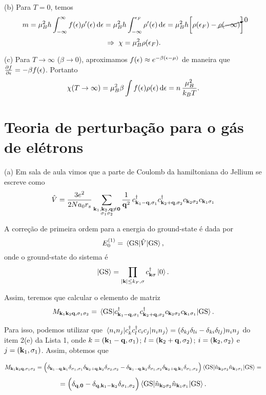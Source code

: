 \documentclass[a4paper,10pt]{article}
\begin{document}
(b) Para $T = 0$, temos
$$
m = \mu_B^2 h \int_{-\infty}^{\infty} f(\epsilon) \rho'(\epsilon) \dd{\epsilon} =
\mu_B^2 h \int_{-\infty}^{\epsilon_F} \rho'(\epsilon) \dd{\epsilon} =
\mu_B^2 h \qty[ \rho(\epsilon_F) - \cancelto{0}{\rho(-\infty)} ]
$$
$$
\; \Rightarrow \; \chi = \mu_B^2 \rho(\epsilon_F).
$$

(c) Para $T \to \infty$ ($\beta \to 0$), aproximamos $f(\epsilon) \approx e^{-\beta(\epsilon - \mu)}$ de maneira que $\pdv{f}{\epsilon} = -\beta f(\epsilon)$. Portanto
$$
\chi(T \to \infty) = \mu_B^2 \beta \int f(\epsilon) \rho(\epsilon) \dd{\epsilon} = n \, \frac{\mu_B^2}{k_B T}.
$$


\pagebreak


\section{Teoria de perturbação para o gás de elétrons}

(a) Em sala de aula vimos que a parte de Coulomb da hamiltoniana do Jellium se escreve como
\begin{equation} \label{eq:jellium}
\hat{V} = \frac{3 e^2}{2 N a_0 r_s}
\sum_{\substack{\vb{k}_1, \vb{k}_2, \vb{q} \neq \vb{0} \\ \sigma_1 \sigma_2}} \frac{1}{\vb{q}^2} \,
c_{\vb{k}_1 - \vb{q}, \sigma_1}^\dagger c_{\vb{k}_2 + \vb{q}, \sigma_2}^\dagger c_{\vb{k}_2 \sigma_2} c_{\vb{k}_1 \sigma_1}
\end{equation}

A correção de primeira ordem para a energia do ground-state é dada por
$$
E_0^{(1)} = \ev{\hat{V}}{\text{GS}},
$$
onde o ground-state do sistema é
$$
\ket{\text{GS}} = \prod_{\abs{\vb{k}} \leq k_{F}, \sigma} c_{\vb{k} \sigma}^{\dagger} \ket{0}.
$$

Assim, teremos que calcular o elemento de matriz
$$
M_{\k_1 \k_2 \q, \s_1 \s_2} = \ev{c_{\k_1 - \q, \s_1}^\d c_{\k_2 + \q, \s_2}^\d c_{\k_2 \s_2} c_{\k_1 \s_1}}{\text{GS}}.
$$

Para isso, podemos utilizar que $\ev{c_k^\d c_l^\d c_i c_j}{n_i n_j} = (\delta_{kj} \delta_{li} - \delta_{ki} \delta_{lj}) n_i n_j$ do item 2(e) da Lista 1, onde $k = (\vb{k}_1 - \vb{q}, \sigma_1)$; $l = (\vb{k}_2 + \vb{q}, \sigma_2)$; $i = (\vb{k}_2, \sigma_2)$ e $j = (\vb{k}_1, \sigma_1)$. Assim, obtemos que

$$
M_{\k_1 \k_2 \q, \s_1 \s_2} =
\Big(
\delta_{\k_1 - \q, \k_1} \delta_{\s_1, \s_1} \delta_{\k_2 + \q, \k_2} \delta_{\s_2, \s_2} -
\delta_{\k_1 - \q, \k_2} \delta_{\s_1, \s_2} \delta_{\k_2 + \q, \k_1} \delta_{\s_1, \s_2}
\Big) \ev{\nn_{\k_2 \s_2} \nn_{\k_1 \s_1}}{\text{GS}} =
$$
$$
=
\Big(
\delta_{\q, \0} -
\delta_{\q, \k_1 - \k_2} \delta_{\s_1, \s_2}
\Big) \ev{\nn_{\k_2 \s_2} \nn_{\k_1 \s_1}}{\text{GS}}.
$$
\end{document}
